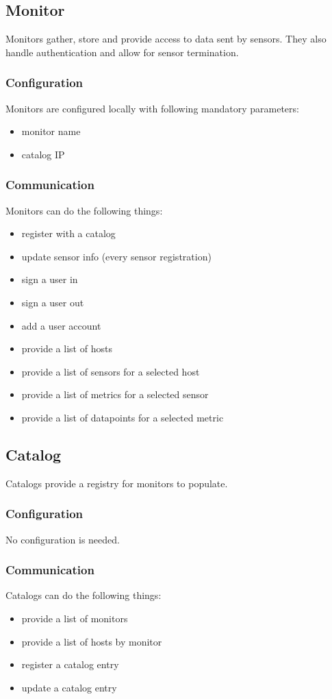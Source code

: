 \documentclass[a4paper]{article}
\begin{document}
\subsection{Monitor}
Monitors gather, store and provide access to data sent by sensors.
They also handle authentication and allow for sensor termination.
\subsubsection{Configuration}
Monitors are configured locally with following mandatory parameters:
\begin{itemize}
	\item monitor name
	\item catalog IP
\end{itemize}
\subsubsection{Communication}
Monitors can do the following things:
\begin{itemize}
	\item register with a catalog
	\item update sensor info (\@ every sensor registration)
	\item sign a user in
	\item sign a user out
	\item add a user account
	\item provide a list of hosts
	\item provide a list of sensors for a selected host
	\item provide a list of metrics for a selected sensor
	\item provide a list of datapoints for a selected metric
\end{itemize}
\subsection{Catalog}
Catalogs provide a registry for monitors to populate.
\subsubsection{Configuration}
No configuration is needed.
\subsubsection{Communication}
Catalogs can do the following things:
\begin{itemize}
	\item provide a list of monitors
	\item provide a list of hosts by monitor
	\item register a catalog entry
	\item update a catalog entry
\end{itemize}
\end{document}
